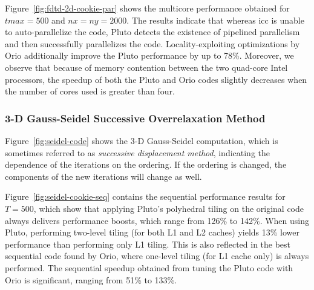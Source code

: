  
Figure~\ref{fig:fdtd-2d-cookie-par} shows the multicore performance
obtained for $tmax=500$ and $nx=ny=2000$. The results indicate that
whereas icc is unable to auto-parallelize the code, Pluto detects the
existence of pipelined parallelism and then successfully parallelizes
the code. Locality-exploiting optimizations by Orio additionally
improve the Pluto performance by up to 78\%. Moreover, we observe
that because of memory contention between the two quad-core Intel
processors, the speedup of both the Pluto and Orio codes slightly
decreases when the number of cores used is greater than four.
 

\subsubsection{3-D Gauss-Seidel Successive Overrelaxation Method}  
Figure~\ref{fig:seidel-code} shows the 3-D Gauss-Seidel computation, 
which is sometimes referred to as
\emph{successive displacement method}, indicating the dependence of the 
iterations on the ordering. If the ordering is changed, the components
of the new iterations will change as well.

Figure~\ref{fig:seidel-cookie-seq} contains the sequential performance
results for $T=500$, which show that applying Pluto's polyhedral tiling on
the original code always delivers performance boosts, which range from 126\%
to 142\%. When using Pluto, performing two-level tiling (for both L1 and L2
caches) yields 13\% lower performance than performing only L1 tiling. 
This is also reflected in the best sequential code found by Orio, where
one-level tiling (for L1 cache only) is always performed. The sequential
speedup obtained from tuning the Pluto code with Orio is significant, ranging
from 51\% to 133\%.


